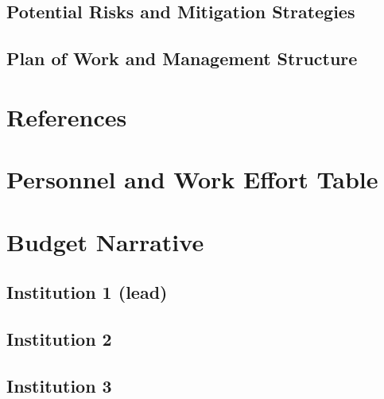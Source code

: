\documentclass[oneside,12pt]{article}
\begin{document}
    \subsection{Potential Risks and Mitigation Strategies}

    \subsection{Plan of Work and Management Structure}

    \clearpage

    \section{References}

    \renewcommand{\refname}{\vspace{-2em}}
    

    \clearpage

    \section{Personnel and Work Effort Table}

    \clearpage


    \section*{Budget Narrative}

    \subsection*{Institution 1 (lead)}

    \subsection*{Institution 2}

    \subsection*{Institution 3}
\end{document}
